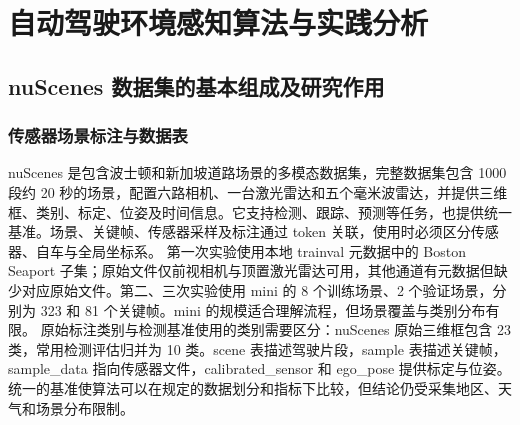 \documentclass[UTF8,zihao=-4,fontset=windows]{ctexart}
\begin{document}
\section{自动驾驶环境感知算法与实践分析}
\FloatBarrier
\subsection{nuScenes 数据集的基本组成及研究作用}
\subsubsection{传感器场景标注与数据表}
nuScenes 是包含波士顿和新加坡道路场景的多模态数据集，完整数据集包含 1000 段约 20 秒的场景，配置六路相机、一台激光雷达和五个毫米波雷达，并提供三维框、类别、标定、位姿及时间信息。它支持检测、跟踪、预测等任务，也提供统一基准。场景、关键帧、传感器采样及标注通过 token 关联，使用时必须区分传感器、自车与全局坐标系。
第一次实验使用本地 trainval 元数据中的 Boston Seaport 子集；原始文件仅前视相机与顶置激光雷达可用，其他通道有元数据但缺少对应原始文件。第二、三次实验使用 mini 的 8 个训练场景、2 个验证场景，分别为 323 和 81 个关键帧。mini 的规模适合理解流程，但场景覆盖与类别分布有限。
原始标注类别与检测基准使用的类别需要区分：nuScenes 原始三维框包含 23 类，常用检测评估归并为 10 类。scene 表描述驾驶片段，sample 表描述关键帧，sample\_data 指向传感器文件，calibrated\_sensor 和 ego\_pose 提供标定与位姿。统一的基准使算法可以在规定的数据划分和指标下比较，但结论仍受采集地区、天气和场景分布限制。
\end{document}
